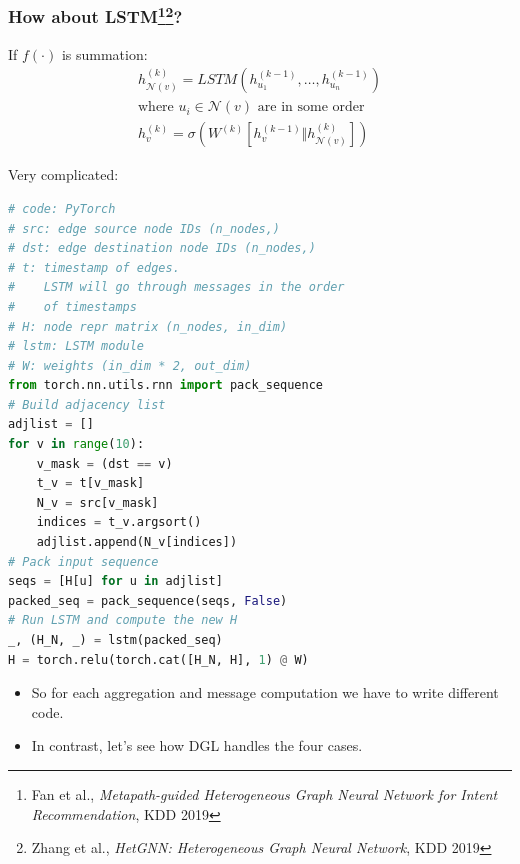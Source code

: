 \documentclass[10pt,aspectratio=169]{beamer}
\begin{document}
	\begin{frame}[fragile]
		\frametitle{How about LSTM\footnote{Fan et al., \emph{Metapath-guided Heterogeneous Graph Neural Network for Intent Recommendation}, KDD 2019}\footnote{Zhang et al., \emph{HetGNN: Heterogeneous Graph Neural Network}, KDD 2019}?}
		\begin{minipage}{0.4\textwidth}
			If $f(\cdot)$ is summation:
			$$
			\begin{gathered}
			h_{\mathcal{N}(v)}^{(k)} =
			LSTM( h^{(k-1)}_{u_1}, \dots, h^{(k-1)}_{u_n} ) \\
			\text{where } u_i\in \mathcal{N}(v) \text{ are in some order} \\
			h^{(k)}_v =
			\sigma \left( W^{(k)} \left[h_v^{(k-1)} \Vert h_{\mathcal{N}(v)}^{(k)}\right] \right)
			\end{gathered}
			$$
		\end{minipage}\hfill%
		\begin{minipage}{0.5\textwidth}
			Very complicated:
\begin{lstlisting}[language=Python]
# code: PyTorch
# src: edge source node IDs (n_nodes,)
# dst: edge destination node IDs (n_nodes,)
# t: timestamp of edges.
#    LSTM will go through messages in the order
#    of timestamps
# H: node repr matrix (n_nodes, in_dim)
# lstm: LSTM module
# W: weights (in_dim * 2, out_dim)
from torch.nn.utils.rnn import pack_sequence
# Build adjacency list
adjlist = []
for v in range(10): 
    v_mask = (dst == v) 
    t_v = t[v_mask] 
    N_v = src[v_mask] 
    indices = t_v.argsort() 
    adjlist.append(N_v[indices])
# Pack input sequence
seqs = [H[u] for u in adjlist]
packed_seq = pack_sequence(seqs, False)
# Run LSTM and compute the new H
_, (H_N, _) = lstm(packed_seq)
H = torch.relu(torch.cat([H_N, H], 1) @ W)
\end{lstlisting}
		\end{minipage}
	\end{frame}

	\begin{frame}
		\begin{itemize}
			\item So for each aggregation and message computation
			we have to write different code.
			\item In contrast, let's see how DGL handles the four cases.
		\end{itemize}
	\end{frame}
\end{document}
